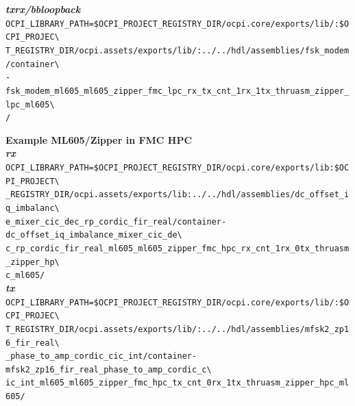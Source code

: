 \noindent\textbf{\textit{txrx/bbloopback}}\\
\verb|OCPI_LIBRARY_PATH=$OCPI_PROJECT_REGISTRY_DIR/ocpi.core/exports/lib/:$OCPI_PROJEC\| \\
\verb|T_REGISTRY_DIR/ocpi.assets/exports/lib/:../../hdl/assemblies/fsk_modem/container\| \\
\verb|-fsk_modem_ml605_ml605_zipper_fmc_lpc_rx_tx_cnt_1rx_1tx_thruasm_zipper_lpc_ml605\| \\
\verb|/| \\
\par\medskip

\noindent\textbf{Example ML605/Zipper in FMC HPC}\\
\noindent\textbf{\textit{rx}}\\
\verb|OCPI_LIBRARY_PATH=$OCPI_PROJECT_REGISTRY_DIR/ocpi.core/exports/lib:$OCPI_PROJECT\| \\
\verb|_REGISTRY_DIR/ocpi.assets/exports/lib:../../hdl/assemblies/dc_offset_iq_imbalanc\| \\
\verb|e_mixer_cic_dec_rp_cordic_fir_real/container-dc_offset_iq_imbalance_mixer_cic_de\| \\
\verb|c_rp_cordic_fir_real_ml605_ml605_zipper_fmc_hpc_rx_cnt_1rx_0tx_thruasm_zipper_hp\| \\
\verb|c_ml605/| \\

\noindent\textbf{\textit{tx}}\\
\verb|OCPI_LIBRARY_PATH=$OCPI_PROJECT_REGISTRY_DIR/ocpi.core/exports/lib/:$OCPI_PROJEC\| \\
\verb|T_REGISTRY_DIR/ocpi.assets/exports/lib/:../../hdl/assemblies/mfsk2_zp16_fir_real\| \\
\verb|_phase_to_amp_cordic_cic_int/container-mfsk2_zp16_fir_real_phase_to_amp_cordic_c\| \\
\verb|ic_int_ml605_ml605_zipper_fmc_hpc_tx_cnt_0rx_1tx_thruasm_zipper_hpc_ml605/| \\


